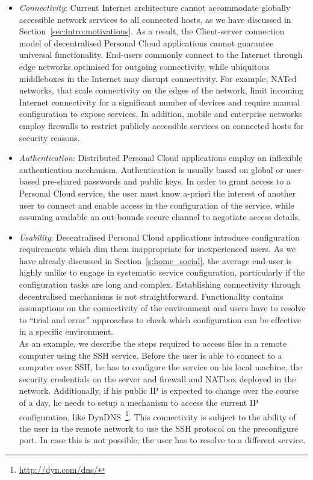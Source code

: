 \begin{itemize}
  \item {\it Connectivity}\/: Current Internet architecture cannot accommodate
    globally accessible network services to all connected hosts, as we have
    discussed in Section~\ref{sec:intro:motivations}. As a result, the
    Client-server connection model of decentralised Personal Cloud applications
    cannot guarantee universal functionality.  End-users commonly connect to
    the Internet through edge networks optimised for outgoing connectivity,
    while ubiquitous middleboxes in the Internet may disrupt connectivity. For
    example, NATed networks, that scale connectivity on the edges of the
    network, limit incoming Internet connectivity for a significant number of
    devices and require manual configuration to expose services. In addition,
    mobile and enterprise networks employ firewalls to restrict publicly
    accessible services on connected hosts for security reasons.
  \item {\it Authentication}\/: Distributed Personal Cloud applications employ
    an inflexible authentication mechanism. Authentication is usually based
    on global or user-based pre-shared passwords and public keys. In order to
    grant access to a Personal Cloud service, the user must know a-priori
    the interest of another user to connect and enable access in
    the configuration of the service, while assuming available
    an out-bounds secure channel to negotiate access details. 
  \item {\it Usability}\/: Decentralised Personal Cloud applications introduce 
    configuration requirements which dim them inappropriate for inexperienced
    users. As we have already discussed in Section~\ref{s:home_social},
    the average end-user is highly unlike to engage in systematic
    service configuration, particularly if the configuration tasks are long and
    complex. Establishing connectivity through decentralised mechanisms is
    not straightforward. Functionality contains
    assumptions on the connectivity of the environment and users have to
    resolve to ``trial and error'' approaches to check which configuration
    can be effective in a specific environment. \\ 
    As an example, we describe the steps required to access files in a remote
    computer using the SSH service. Before the user is able to connect to a
    computer over SSH, he has to configure the service on his local machine, the
    security credentials on the server and firewall and NATbox deployed in the
    network. Additionally, if his public IP is expected to change over the
    course of a day, he needs to setup a mechanism to access the current IP
    configuration, like DynDNS~\footnote{\url{http://dyn.com/dns/}}\@.  This
    connectivity is subject to the ability of the user in the remote network to
    use the SSH protocol on the preconfigure port.  In case this is not
    possible, the user has to resolve to a different service.   
\end{itemize}

